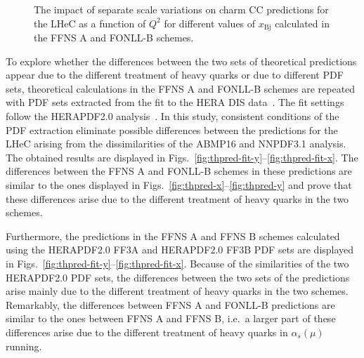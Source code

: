 \documentclass[pdftex,twocolumn,epjc3]{svjour3}          %
\newcommand{\abmp} {ABMP16\xspace}
\newcommand{\nnpdf} {NNPDF3.1\xspace}
\newcommand{\xbj}{\ensuremath{x_{\text{Bj}}}\xspace}
\newcommand{\fonll} {{FONLL-B}\xspace}
\newcommand{\ffns} {{FFNS A}\xspace}
\newcommand{\ffnsb} {{FFNS B}\xspace}
\newcommand{\ffthreea} {{HERAPDF2.0 FF3A}\xspace}
\newcommand{\ffthreeb} {{HERAPDF2.0 FF3B}\xspace}
\begin{document}
\begin{figure}
    \centering
    \caption{The impact of separate scale variations on charm CC predictions for the LHeC as a function of $Q^2$ for different values of \xbj calculated in the \ffns and \fonll schemes.}
    \label{fig:thpred-q2-varmu}
\end{figure}

To explore whether the differences between the two sets of theoretical predictions appear due to the different treatment of heavy quarks or due to different PDF sets, theoretical calculations in the \ffns and \fonll schemes are repeated with PDF sets extracted from the fit to the HERA DIS data~\cite{Abramowicz:2015mha}. The fit settings follow the HERAPDF2.0 analysis~\cite{Abramowicz:2015mha}. 
In this study, consistent conditions of the PDF extraction eliminate possible differences between the predictions for the LHeC arising from the dissimilarities of the \abmp and \nnpdf analysis. The obtained results are displayed in Figs.~\ref{fig:thpred-fit-y}--\ref{fig:thpred-fit-x}. The differences between the \ffns and \fonll schemes in these predictions are similar to the ones displayed in Figs.~\ref{fig:thpred-x}--\ref{fig:thpred-y} and prove that these differences arise due to the different treatment of heavy quarks in the two schemes.

Furthermore, the predictions in the \ffns and \ffnsb schemes calculated using the \ffthreea and \ffthreeb PDF sets are displayed in Figs.~\ref{fig:thpred-fit-y}--\ref{fig:thpred-fit-x}. Because of the similarities of the two HERAPDF2.0 PDF sets, the differences between the two sets of the predictions arise mainly due to the different treatment of heavy quarks in the two schemes. Remarkably, the differences between \ffns and \fonll predictions are similar to the ones between \ffns and \ffnsb, i.e.\ a larger part of these differences arise due to the different treatment of heavy quarks in $\alpha_s(\mu)$ running.
\end{document}
